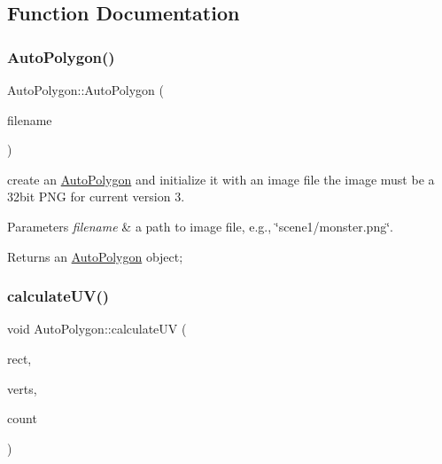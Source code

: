 \subsection{Function Documentation}
\mbox{\label{group____2d_gaa74351ac8f735344958e7b2ac8363bb5}} 
\subsubsection{\texorpdfstring{Auto\+Polygon()}{AutoPolygon()}}
{\footnotesize\ttfamily Auto\+Polygon\+::\+Auto\+Polygon (\begin{DoxyParamCaption}\item[{const std\+::string \&}]{filename }\end{DoxyParamCaption})}

create an \hyperlink{classAutoPolygon}{Auto\+Polygon} and initialize it with an image file the image must be a 32bit P\+NG for current version 3. 
\begin{DoxyParams}{Parameters}
{\em filename} & a path to image file, e.\+g., \char`\"{}scene1/monster.\+png\char`\"{}. \\
\hline
\end{DoxyParams}
\begin{DoxyReturn}{Returns}
an \hyperlink{classAutoPolygon}{Auto\+Polygon} object; 
\end{DoxyReturn}
\mbox{\label{group____2d_gab4db69f4d34a6f61c4a71590043056da}} 
\subsubsection{\texorpdfstring{calculate\+U\+V()}{calculateUV()}\hspace{0.1cm}{\footnotesize\ttfamily [1/2]}}
{\footnotesize\ttfamily void Auto\+Polygon\+::calculate\+UV (\begin{DoxyParamCaption}\item[{const \hyperlink{classRect}{Rect} \&}]{rect,  }\item[{\hyperlink{structV3F__C4B__T2F}{V3\+F\+\_\+\+C4\+B\+\_\+\+T2F} $\ast$}]{verts,  }\item[{const ssize\+\_\+t \&}]{count }\end{DoxyParamCaption})}


